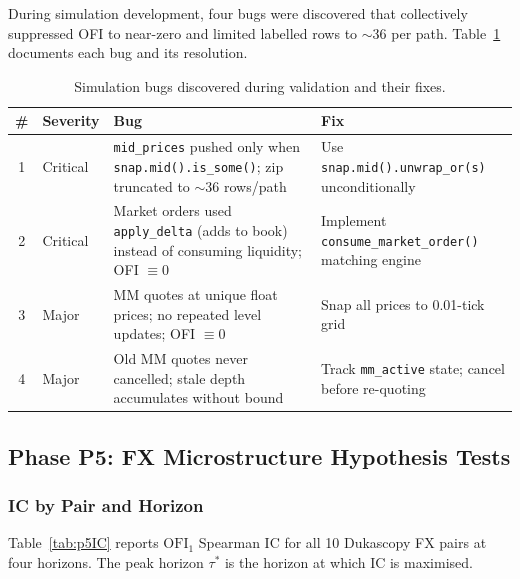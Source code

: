 \documentclass[12pt,a4paper]{article}
\theoremstyle{definition}
\theoremstyle{remark}
\newcommand{\OFI}{\mathrm{OFI}}
\newcommand{\code}[1]{\texttt{\small #1}}
\begin{document}
During simulation development, four bugs were discovered that
collectively suppressed OFI to near-zero and limited labelled rows
to $\sim$36 per path. Table~\ref{tab:simbugs} documents each bug
and its resolution.

\begin{table}[H]
\centering
\caption{Simulation bugs discovered during validation and their fixes.}
\label{tab:simbugs}
\small
\setlength{\tabcolsep}{4pt}
\begin{tabular}{cl>{\RaggedRight\arraybackslash}p{5.2cm}>{\RaggedRight\arraybackslash}p{5.2cm}}
\toprule
\textbf{\#} & \textbf{Severity} & \textbf{Bug} & \textbf{Fix} \\
\midrule
1 & Critical &
  \code{mid\_prices} pushed only when \code{snap.mid().is\_some()};
  zip truncated to $\sim$36 rows/path &
  Use \code{snap.mid().unwrap\_or(s)} unconditionally \\
2 & Critical &
  Market orders used \code{apply\_delta} (adds to book)
  instead of consuming liquidity; OFI $\equiv 0$ &
  Implement \code{consume\_market\_order()} matching engine \\
3 & Major &
  MM quotes at unique float prices; no repeated level updates;
  OFI $\equiv 0$ &
  Snap all prices to 0.01-tick grid \\
4 & Major &
  Old MM quotes never cancelled; stale depth accumulates
  without bound &
  Track \code{mm\_active} state; cancel before re-quoting \\
\bottomrule
\end{tabular}
\end{table}

\subsection{Phase P5: FX Microstructure Hypothesis Tests}
\label{sec:p5_results}

\subsubsection{IC by Pair and Horizon}

Table~\ref{tab:p5IC} reports $\OFI_1$ Spearman IC for all 10
Dukascopy FX pairs at four horizons. The peak horizon $\tau^*$ is the
horizon at which IC is maximised.
\end{document}
